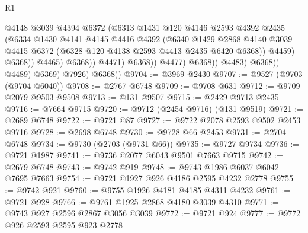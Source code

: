 \begin{lexlean}{R1}
\begin{coremodule}
                                        @4148
                                        @3039
                                        @4394
                                        @6372
                                        (@6313
                                          @1431
                                          @120
                                          @4146
                                          @2593
                                          @4392
                                          @2435
                                          (@6334
                                            @1430
                                            @4141
                                            @4145
                                            @4416
                                            @4392
                                            (@6340
                                              @1429
                                              @2868
                                              @4140
                                              @3039
                                              @4415
                                              @6372
                                              (@6328 @120 @4138 @2593 @4413 @2435 @6420 @6368))
                                            @4459)
                                          @6368))
                                      @4465)
                                    @6368))
                                @4471)
                              @6368))
                          @4477)
                        @6368))
                    @4483)
                  @6368))
              @4489)
            @6369)
          @7926)
        @6368))
@9704 := @3969 @2430
@9707 := @9527 (@9703 (@9704 @6040))
@9708 := @2767 @6748
@9709 := @9708 @631
@9712 := @9709 @2079 @9503 @9508
@9713 := @131 @9507
@9715 := @2429 @9713 @2435
@9716 := @7664 @9715
@9720 := @9712 (@2454 @9716) (@131 @9519)
@9721 := @2689 @6748
@9722 := @9721 @87
@9727 := @9722 @2078 @2593 @9502 @2453 @9716
@9728 := @2698 @6748
@9730 := @9728 @66 @2453
@9731 := @2704 @6748
@9734 := @9730 (@2703 (@9731 @66))
@9735 := @9727 @9734
@9736 := @9721 @1987
@9741 := @9736 @2077 @6043 @9501 @7663 @9715
@9742 := @2679 @6748
@9743 := @9742 @919
@9748 := @9743 @1986 @6037 @6042 @7695 @7663
@9754 := @9721 @1927 @926 @4186 @2595 @4232 @2778
@9755 := @9742 @921
@9760 := @9755 @1926 @4181 @4185 @4311 @4232
@9761 := @9721 @928
@9766 := @9761 @1925 @2868 @4180 @3039 @4310
@9771 := @9743 @927 @2596 @2867 @3056 @3039
@9772 := @9721 @924
@9777 := @9772 @926 @2593 @2595 @923 @2778

\end{coremodule}
\end{lexlean}

